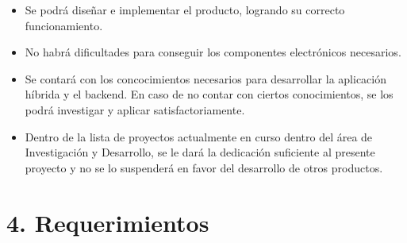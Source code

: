 \documentclass[
11pt, %
codirector, %
]{charter}
\begin{document}
\begin{itemize}
	\item Se podrá diseñar e implementar el producto, logrando su correcto funcionamiento.
	\item No habrá dificultades para conseguir los componentes electrónicos necesarios.
	\item Se contará con los concocimientos necesarios para desarrollar la aplicación híbrida y el backend. En caso de no contar con ciertos conocimientos, se los podrá investigar y aplicar satisfactoriamente.
	\item Dentro de la lista de proyectos actualmente en curso dentro del área de Investigación y Desarrollo, se le dará la dedicación suficiente al presente proyecto y no se lo suspenderá en favor del desarrollo de otros productos.
\end{itemize}


\section{4. Requerimientos}
\label{sec:requerimientos}

\end{document}
